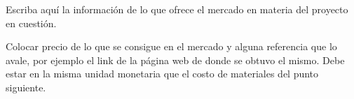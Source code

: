 \justifying

Escriba aquí la información de lo que ofrece el mercado en materia del proyecto en
cuestión.

Colocar precio de lo que se consigue en el mercado y alguna referencia que lo avale, por ejemplo el link de la página web de donde se obtuvo el mismo. Debe estar en la misma unidad monetaria que el costo de materiales del punto siguiente.